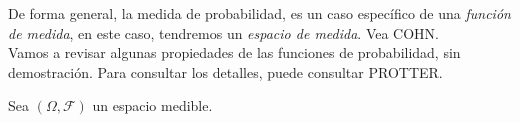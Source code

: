 De forma general, la medida de probabilidad, es un caso específico de una \textit{función de medida}, en este caso, tendremos un \textit{espacio de medida}. Vea COHN.\\

Vamos a revisar algunas propiedades de las funciones de probabilidad, sin demostración. Para consultar los detalles, puede consultar PROTTER.

\begin{theorem}
	Sea $(\Omega, \mathcal{F})$ un espacio medible.
\end{theorem}















